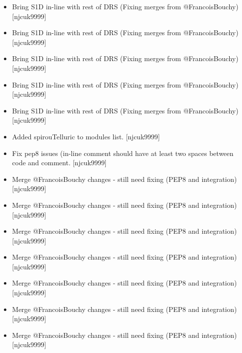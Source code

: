 \documentclass[a4paper,10pt,english]{report}
\begin{document}
\begin{itemize}
\item {} 
Bring S1D  in-line with rest of DRS (Fixing merges from
@FrancoisBouchy) {[}njcuk9999{]}

\item {} 
Bring S1D  in-line with rest of DRS (Fixing merges from
@FrancoisBouchy) {[}njcuk9999{]}

\item {} 
Bring S1D  in-line with rest of DRS (Fixing merges from
@FrancoisBouchy) {[}njcuk9999{]}

\item {} 
Bring S1D  in-line with rest of DRS (Fixing merges from
@FrancoisBouchy) {[}njcuk9999{]}

\item {} 
Bring S1D  in-line with rest of DRS (Fixing merges from
@FrancoisBouchy) {[}njcuk9999{]}

\item {} 
Added spirouTelluric to modules list. {[}njcuk9999{]}

\item {} 
Fix pep8 issues (in-line comment should have at least two spaces
between code and comment. {[}njcuk9999{]}

\item {} 
Merge @FrancoisBouchy changes - still need fixing (PEP8 and
integration) {[}njcuk9999{]}

\item {} 
Merge @FrancoisBouchy changes - still need fixing (PEP8 and
integration) {[}njcuk9999{]}

\item {} 
Merge @FrancoisBouchy changes - still need fixing (PEP8 and
integration) {[}njcuk9999{]}

\item {} 
Merge @FrancoisBouchy changes - still need fixing (PEP8 and
integration) {[}njcuk9999{]}

\item {} 
Merge @FrancoisBouchy changes - still need fixing (PEP8 and
integration) {[}njcuk9999{]}

\item {} 
Merge @FrancoisBouchy changes - still need fixing (PEP8 and
integration) {[}njcuk9999{]}

\item {} 
Merge @FrancoisBouchy changes - still need fixing (PEP8 and
integration) {[}njcuk9999{]}


\end{itemize}
\end{document}
